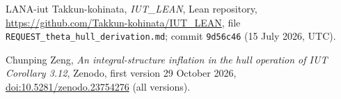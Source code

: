 \documentclass[11pt]{amsart}
\theoremstyle{remark}
\begin{document}
\begin{thebibliography}{LANA-iut}
Takkun-kohinata, \emph{IUT\_LEAN}, Lean repository, \url{https://github.com/Takkun-kohinata/IUT_LEAN}, file
  \texttt{REQUEST\_theta\_hull\_derivation.md}; commit \texttt{9d56c46} (15 July 2026, UTC).

Chunping Zeng, \emph{An integral-structure inflation in the hull operation of {IUT} {C}orollary 3.12}, Zenodo,
  first version 29 October 2026,
  \href{https://doi.org/10.5281/zenodo.23754276}{doi:10.5281/zenodo.23754276} (all versions).

\end{thebibliography}
\end{document}
